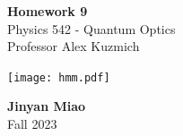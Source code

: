 \documentclass[11pt, oneside]{book}
\theoremstyle{break}
\theoremstyle{break}
\begin{document}
	\begin{titlepage}
		\begin{center}
			\vspace*{0.5cm}
			\Huge \color{red}
				\textbf{Homework 9}\\
			\vspace{0.5cm}			
			\Large \color{black}
			Physics 542 - Quantum Optics\\
			Professor Alex Kuzmich
			\vspace{1.5cm}

			\texttt{[image: hmm.pdf]}
			
			
			\vspace{2cm}
			\LARGE
				\textbf{Jinyan Miao}\\
				\hfill\break
				\LARGE Fall 2023\\
			\vspace{1cm}

		\vspace*{\fill}
		\end{center}			
	\end{titlepage}
\end{document}
